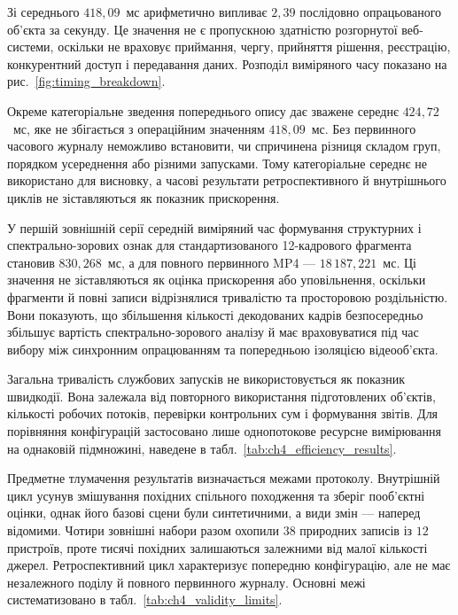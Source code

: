 Зі середнього $418{,}09$~мс арифметично випливає $2{,}39$ послідовно опрацьованого об’єкта за секунду. Це значення не є пропускною здатністю розгорнутої веб-системи, оскільки не враховує приймання, чергу, прийняття рішення, реєстрацію, конкурентний доступ і передавання даних. Розподіл виміряного часу показано на рис.~\ref{fig:timing_breakdown}.



Окреме категоріальне зведення попереднього опису дає зважене середнє $424{,}72$~мс, яке не збігається з операційним значенням $418{,}09$~мс. Без первинного часового журналу неможливо встановити, чи спричинена різниця складом груп, порядком усереднення або різними запусками. Тому категоріальне середнє не використано для висновку, а часові результати ретроспективного й внутрішнього циклів не зіставляються як показник прискорення.

У першій зовнішній серії середній виміряний час формування структурних і спектрально-зорових ознак для стандартизованого 12-кадрового фрагмента становив $830{,}268$~мс, а для повного первинного MP4 --- $18\,187{,}221$~мс. Ці значення не зіставляються як оцінка прискорення або уповільнення, оскільки фрагменти й повні записи відрізнялися тривалістю та просторовою роздільністю. Вони показують, що збільшення кількості декодованих кадрів безпосередньо збільшує вартість спектрально-зорового аналізу й має враховуватися під час вибору між синхронним опрацюванням та попередньою ізоляцією відеооб’єкта.

Загальна тривалість службових запусків не використовується як показник швидкодії. Вона залежала від повторного використання підготовлених об’єктів, кількості робочих потоків, перевірки контрольних сум і формування звітів. Для порівняння конфігурацій застосовано лише однопотокове ресурсне вимірювання на однаковій підмножині, наведене в табл.~\ref{tab:ch4_efficiency_results}.

Предметне тлумачення результатів визначається межами протоколу. Внутрішній цикл усунув змішування похідних спільного походження та зберіг пооб’єктні оцінки, однак його базові сцени були синтетичними, а види змін --- наперед відомими. Чотири зовнішні набори разом охопили $38$ природних записів із $12$ пристроїв, проте тисячі похідних залишаються залежними від малої кількості джерел. Ретроспективний цикл характеризує попередню конфігурацію, але не має незалежного поділу й повного первинного журналу. Основні межі систематизовано в табл.~\ref{tab:ch4_validity_limits}.


